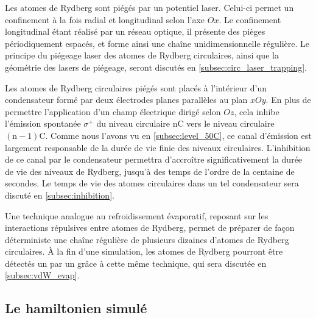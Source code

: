 Les atomes de Rydberg sont piégés par un potentiel laser.
Celui-ci permet un confinement à la fois radial et longitudinal selon l'axe $Ox$.
Le confinement longitudinal étant réalisé par un réseau optique, il présente des pièges périodiquement espacés, et forme ainsi une chaîne unidimensionnelle régulière.
Le principe du piégeage laser des atomes de Rydberg circulaires, ainsi que la géométrie des lasers de piégeage, seront discutés en \ref{subsec:circ_laser_trapping}.

Les atomes de Rydberg circulaires piégés sont placés à l'intérieur d'un condensateur formé par deux électrodes planes parallèles au plan $xOy$.
En plus de permettre l'application d'un champ électrique dirigé selon $Oz$, cela inhibe l'émission spontanée $\sigma^+$ du niveau circulaire $\mathrm{nC}$ vers le niveau circulaire $\mathrm{(n-1)C}$.
Comme nous l'avons vu en \ref{subsec:level_50C}, ce canal d'émission est largement responsable de la durée de vie finie des niveaux circulaires.
L'inhibition de ce canal par le condensateur permettra d'accroître significativement la durée de vie des niveaux de Rydberg, jusqu'à des temps de l'ordre de la centaine de secondes.
Le temps de vie des atomes circulaires dans un tel condensateur sera discuté en \ref{subsec:inhibition}.

Une technique analogue au refroidissement évaporatif, reposant sur les interactions répulsives entre atomes de Rydberg, permet de préparer de façon déterministe une chaîne régulière de plusieurs dizaines d'atomes de Rydberg circulaires.
\`A la fin d'une simulation, les atomes de Rydberg pourront être détectés un par un grâce à cette même technique, qui sera discutée en \ref{subsec:vdW_evap}.

\subsection{Le hamiltonien simulé}\label{subsec:XXZhamiltonian}
